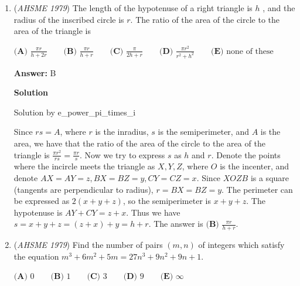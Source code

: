 \begin{enumerate}
 



\textbf{Solution 1.1 (Guiding through the thought process)}

Thinking through the problem, we can see $\arctan a$ is the angle whose tangent is $0.5$. $\arctan b$ is the angle whose tangent is $\frac{1}{3}$. Call the former angle $\theta_1$, the latter $\theta_2$. So we are trying to find $\theta_1+\theta_2$. So given two tangent measures, it is natural for us to think about the sum of tangent measures (what else can we try? Remember: we are not allowed to use calculators). Plug in as above and continue on.

 


	\item (\textit{AHSME 1979}) The length of the hypotenuse of a right triangle is $h$ , and the radius of the inscribed circle is $r$. 
The ratio of the area of the circle to the area of the triangle is


 $\textbf{(A) }\frac{\pi r}{h+2r}\qquad \textbf{(B) }\frac{\pi r}{h+r}\qquad \textbf{(C) }\frac{\pi}{2h+r}\qquad \textbf{(D) }\frac{\pi r^2}{r^2+h^2}\qquad \textbf{(E) }\text{none of these}$

 \textbf{Answer: }B



\textbf{Solution}

Solution by e\_power\_pi\_times\_i

 Since $rs = A$, where $r$ is the inradius, $s$ is the semiperimeter, and $A$ is the area, we have that the ratio of the area of the circle to the area of the triangle is $\frac{\pi r^2}{rs} = \frac{\pi r}{s}$. Now we try to express $s$ as $h$ and $r$. Denote the points where the incircle meets the triangle as $X,Y,Z$, where $O$ is the incenter, and denote $AX = AY = z, BX = BZ = y, CY = CZ = x$. Since $XOZB$ is a square (tangents are perpendicular to radius), $r = BX = BZ = y$. The perimeter can be expressed as $2(x+y+z)$, so the semiperimeter is $x+y+z$. The hypotenuse is $AY+CY = z+x$. Thus we have $s = x+y+z = (z+x)+y = h+r$. The answer is $\boxed{\textbf{(B) } \frac{\pi r}{h+r}}$.

 


	\item (\textit{AHSME 1979}) Find the number of pairs $(m, n)$ of integers which satisfy the equation $m^3 + 6m^2 + 5m = 27n^3 + 9n^2 + 9n + 1$.


 $\textbf{(A) }0\qquad \textbf{(B) }1\qquad \textbf{(C) }3\qquad \textbf{(D) }9\qquad \textbf{(E) }\infty$


\end{enumerate}
